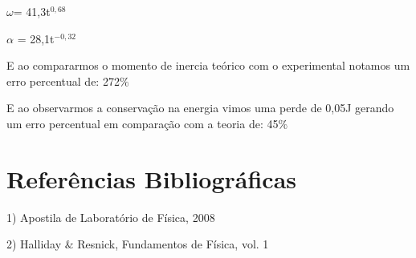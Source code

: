 \documentclass[
	12pt,				%
	oneside,			%
	a4paper,			%
	english,			%
	french,				%
	spanish,			%
	brazil,				%
	]{abntex2}
\begin{document}
$\omega$= 41,3t$^{0,68}$

$\alpha$ = 28,1t$^{-0,32}$

E ao compararmos o momento de inercia teórico com o experimental notamos um erro percentual de: 272$\%$

E ao observarmos a conservação na energia vimos uma perde de 0,05J gerando um erro percentual em comparação com a teoria 
de: 45$\%$

\postextual

\newpage
\section[Referências Bibliográficas]{Referências Bibliográficas}
\pagestyle{fancy}

1) Apostila de Laboratório de Física, 2008

2) Halliday $\&$ Resnick, Fundamentos de Física, vol. 1
%
%
\end{document}
